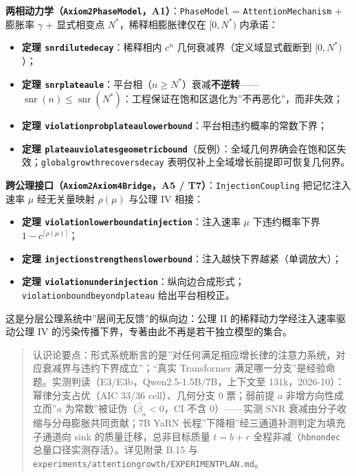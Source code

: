 \documentclass[
]{ctexart}
\providecommand{\tightlist}{%
  \setlength{\itemsep}{0pt}\setlength{\parskip}{0pt}}
\renewcommand{\_}{\discretionary{}{}{\textunderscore}}
\begin{document}
\textbf{两相动力学（\texttt{Axiom2\_PhaseModel}，A1）}：\texttt{PhaseModel}
= \texttt{AttentionMechanism} + 膨胀率 \(\gamma\) + 显式相变点
\(N^*\)，稀释相膨胀律仅在 \([0,N^*)\) 内承诺：

\begin{itemize}
\tightlist
\item
  \textbf{定理 \texttt{snr\_dilute\_decay}}：稀释相内 \(c^n\)
  几何衰减界（定义域显式截断到 \([0,N^*)\)）；
\item
  \textbf{定理
  \texttt{snr\_plateau\_le}}：平台相（\(n\ge N^*\)）衰减\textbf{不逆转}------\(\operatorname{snr}(n)\le\operatorname{snr}(N^*)\)：工程保证在饱和区退化为''不再恶化''，而非失效；
\item
  \textbf{定理
  \texttt{violation\_prob\_plateau\_lower\_bound}}：平台相违约概率的常数下界；
\item
  \textbf{定理
  \texttt{plateau\_violates\_geometric\_bound}}（反例）：全域几何界确会在饱和区失效；\texttt{global\_growth\_recovers\_decay}
  表明仅补上全域增长前提即可恢复几何界。
\end{itemize}

\textbf{跨公理接口（\texttt{Axiom2\_Axiom4\_Bridge}，A5 /
T7）}：\texttt{InjectionCoupling} 把记忆注入速率 \(\mu\) 经无关量映射
\(\rho(\mu)\) 与公理 IV 相接：

\begin{itemize}
\tightlist
\item
  \textbf{定理
  \texttt{violation\_lower\_bound\_at\_injection}}：注入速率 \(\mu\)
  下违约概率下界 \(1-c^{\lceil\rho(\mu)\rceil}\)；
\item
  \textbf{定理
  \texttt{injection\_strengthens\_lower\_bound}}：注入越快下界越紧（单调放大）；
\item
  \textbf{定理
  \texttt{violation\_under\_injection}}：纵向边合成形式；\texttt{violation\_bound\_beyond\_plateau}
  给出平台相校正。
\end{itemize}

这是分层公理系统中''层间无反馈''的纵向边：公理 II
的稀释动力学经注入速率驱动公理 IV
的污染传播下界，专著由此不再是若干独立模型的集合。

\begin{quote}
认识论要点：形式系统断言的是''对任何满足相应增长律的注意力系统，对应衰减界与违约下界成立''；``真实
Transformer
满足哪一分支''是经验命题。实测判读（E3/E3b，Qwen2.5-1.5B/7B，上下文至
131k，2026-10）：幂律分支占优（AIC 33/36 cell）、几何分支 0 票；弱前提
\(a\) 非增方向性成立而''\(a\) 为常数''被证伪（\(\hat\beta_a<0\)，CI 不含
0）------实测 SNR 衰减由分子收缩与分母膨胀共同贡献；7B YaRN
长程''下降相''经三通道补测判定为填充子通道向 sink
的质量迁移，总非目标质量 \(t=b+r\) 全程非减（\texttt{hb\_nondec}
总量口径实测存活）。详见附录 B.15 与
\texttt{experiments/attention\_growth/EXPERIMENT\_PLAN.md}。
\end{quote}
\end{document}

